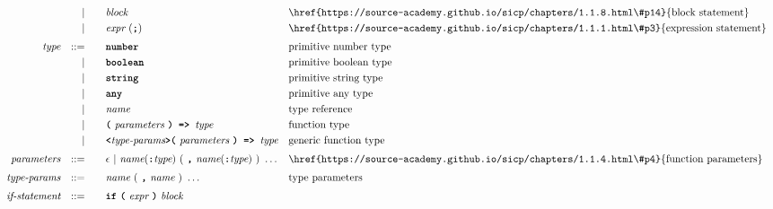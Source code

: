 \begin{alignat*}{9}
&&                       && |   &\quad &&  \textit{block} 
                                                           && \textrm{\href{https://source-academy.github.io/sicp/chapters/1.1.8.html\#p14}{block statement}}\\
&&                       && |   &\quad &&  \textit{expr} \ (\textbf{\texttt{;}})
                                                           && \textrm{\href{https://source-academy.github.io/sicp/chapters/1.1.1.html\#p3}{expression statement}} \\[1mm]
&& \textit{type}         && ::= & && \code{number} && \textrm{primitive number type} \\
&&                       && |   &\quad && \code{boolean} && \textrm{primitive boolean type} \\ 
&&                       && |   &\quad && \code{string} && \textrm{primitive string type} \\ 
&&                       && |   &\quad && \code{any} && \textrm{primitive any type} \\ 
&&                       && |   &\quad && \textit{name} && \textrm{type reference} \\
&&                       && |   &\quad && \code{(}\ \textit{parameters}\ \code{) => } \textit{type} 
                                            && \textrm{function type} \\
&&                       && |   &\quad && \code{<} \textit{type-params} \code{>(}\ 
                                            \textit{parameters}\ \code{) => } \textit{type} 
                                            && \textrm{generic function type} \\[1mm]
&& \textit{parameters}   && ::= &\quad &&  \epsilon\ | \  \textit{name} (\code{:} \textit{type}) \ 
                                                   (\ \textbf{\texttt{,}} \ \textit{name} (\code{:} \textit{type})\ )\ \ldots
                                                            && \textrm{\href{https://source-academy.github.io/sicp/chapters/1.1.4.html\#p4}{function parameters}}   \\[1mm]
&& \textit{type-params}   && ::= &\quad &&  \textit{name} \ (\ \code{,} \ \textit{name}\ )\ \ldots
                                                && \textrm{type parameters}   \\[1mm]
&& \textit{if-statement} && ::= &\quad &&  \textbf{\texttt{if}}\
                                   \textbf{\texttt{(}}\ \textit{expr} \ \textbf{\texttt{)}}\ 
                                   \textit{block} \\

\end{alignat*}

